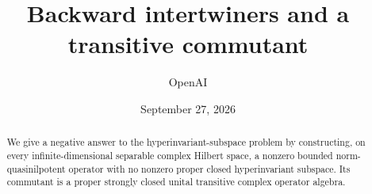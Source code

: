\documentclass[11pt]{article}
\title{Backward intertwiners and a transitive commutant}
\author{OpenAI}
\date{September 27, 2026}
\theoremstyle{remark}\newtheorem{remark}[theorem]{Remark}
\begin{document}
\maketitle
\begin{abstract}
We give a negative answer to the hyperinvariant-subspace problem by
constructing, on every infinite-dimensional separable complex Hilbert space,
a nonzero bounded norm-quasinilpotent operator with no nonzero proper closed
hyperinvariant subspace. Its commutant is a proper strongly closed unital
transitive complex operator algebra.
\end{abstract}
\tableofcontents








\end{document}

